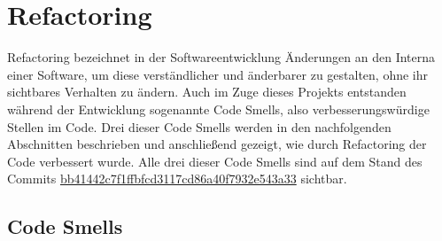 \chapter{Refactoring}
Refactoring bezeichnet in der Softwareentwicklung Änderungen an den Interna einer Software, um diese verständlicher und änderbarer zu gestalten, ohne ihr sichtbares Verhalten zu ändern. Auch im Zuge dieses Projekts entstanden während der Entwicklung sogenannte Code Smells, also verbesserungswürdige Stellen im Code. Drei dieser Code Smells werden in den nachfolgenden Abschnitten beschrieben und anschließend gezeigt, wie durch Refactoring der Code verbessert wurde. Alle drei dieser Code Smells sind auf dem Stand des Commits \href{https://github.com/anditru/quickie/tree/bb41442c7f1ffbfcd3117cd86a40f7932e543a33}{bb41442c7f1ffbfcd3117cd86a40f7932e543a33} sichtbar.

\section{Code Smells}
